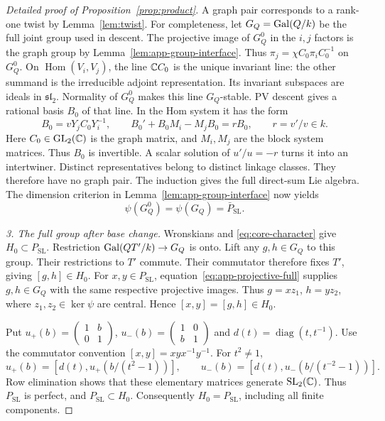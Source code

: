 \begin{proof}[Detailed proof of Proposition~\ref{prop:product}]
A graph pair corresponds to a rank-one twist by Lemma~\ref{lem:twist}.
For completeness, let $G_Q=\operatorname{Gal}(Q/k)$ be the full joint group used in descent.
The projective image of $G_Q^0$ in the $i,j$ factors is the graph group by
Lemma~\ref{lem:app-group-interface}.
Thus $\pi_j=\chi C_0\pi_iC_0^{-1}$ on $G_Q^0$.
On $\operatorname{Hom}(V_i,V_j)$, the line $\mathbb{C} C_0$ is the unique invariant line:
the other summand is the irreducible adjoint representation.
Its invariant subspaces are ideals in $\mathfrak{sl}_2$.
Normality of $G_Q^0$ makes this line $G_Q$-stable.
PV descent gives a rational basis $B_0$ of that line.
In the Hom system it has the form
\[
 B_0=vY_jC_0Y_i^{-1},\qquad
 B_0'+B_0M_i-M_jB_0=rB_0,\qquad r=v'/v\in k.
\]
Here $C_0\in\operatorname{GL}_2(\mathbb{C})$ is the graph matrix, and $M_i,M_j$ are the block
system matrices.
Thus $B_0$ is invertible.
A scalar solution of $u'/u=-r$ turns it into an intertwiner.
Distinct representatives belong to distinct linkage classes.
They therefore have no graph pair.
The induction gives the full direct-sum Lie algebra.
The dimension criterion in Lemma~\ref{lem:app-group-interface} now yields
\begin{equation}\label{eq:app-projective-full}
 \psi(G_Q^0)=\psi(G_Q)=\bar P_{\mathrm{SL}}.
\end{equation}

\emph{3. The full group after base change.}
Wronskians and \eqref{eq:core-character} give $H_0\subset P_{\mathrm{SL}}$.
Restriction $\operatorname{Gal}(QT'/k)\to G_Q$ is onto.
Lift any $g,h\in G_Q$ to this group.
Their restrictions to $T'$ commute.
Their commutator therefore fixes $T'$, giving $[g,h]\in H_0$.
For $x,y\in P_{\mathrm{SL}}$, equation~\eqref{eq:app-projective-full} supplies $g,h\in G_Q$
with the same respective projective images.
Thus $g=xz_1$, $h=yz_2$, where $z_1,z_2\in\ker\psi$ are central.
Hence $[x,y]=[g,h]\in H_0$.

Put $u_+(b)=\left(\begin{smallmatrix}1&b\\0&1\end{smallmatrix}\right)$,
$u_-(b)=\left(\begin{smallmatrix}1&0\\b&1\end{smallmatrix}\right)$ and
$d(t)=\operatorname{diag}(t,t^{-1})$.
Use the commutator convention $[x,y]=xyx^{-1}y^{-1}$.
For $t^2\ne1$,
\[
 u_+(b)=[d(t),u_+(b/(t^2-1))],\qquad
 u_-(b)=[d(t),u_-(b/(t^{-2}-1))].
\]
Row elimination shows that these elementary matrices generate $\operatorname{SL}_2(\mathbb{C})$.
Thus $P_{\mathrm{SL}}$ is perfect, and $P_{\mathrm{SL}}\subset H_0$.
Consequently $H_0=P_{\mathrm{SL}}$, including all finite components.


\end{proof}
